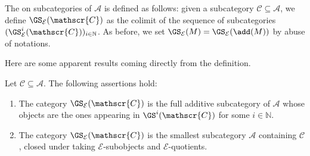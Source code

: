 \begin{definition} \label{def:GSop}
    The  on subcategories of $\mathscr{A}$ is defined as follows: given a subcategory $\mathscr{C} \subseteq \mathscr{A}$, we define $\GS_{\mathcal{E}}(\mathscr{C})$ as the colimit of the sequence of subcategories $(\GS_\mathcal{E}^i(\mathscr{C}))_{i\in \mathbb{N}}$. As before, we set $\GS_\mathcal{E}(M) = \GS_\mathcal{E}(\add(M))$ by abuse of notations.
\end{definition}

Here are some apparent results coming directly from the definition.

\begin{lemma} \label{lem:proponGS}
Let $\mathscr{C} \subseteq \mathscr{A}$. The following assertions hold:
\begin{enumerate}[label=$(\alph*)$,itemsep=1mm]
    \item The category $\GS_\mathcal{E}(\mathscr{C})$ is the full additive subcategory of $\mathscr{A}$ whose objects are the ones appearing in $\GS^i(\mathscr{C})$ for some $i \in \mathbb{N}$.
    \item  The category $\GS_\mathcal{E}(\mathscr{C})$ is the smallest subcategory $\mathscr{A}$ containing $\mathscr{C}$, closed under taking $\mathcal{E}$-subobjects and  $\mathcal{E}$-quotients.  
\end{enumerate}
\end{lemma}

